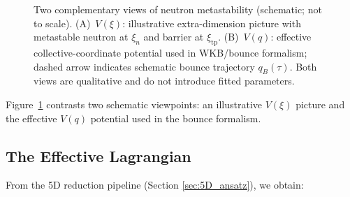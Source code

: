 \documentclass[11pt,a4paper]{article}
\begin{document}
\begin{figure}[ht]
\caption{Two complementary views of neutron metastability (schematic; not to scale).
(A)~$V(\xi)$: illustrative extra-dimension picture with metastable neutron at $\xi_n$ and barrier at $\xi_{\mathrm{tp}}$.
(B)~$V(q)$: effective collective-coordinate potential used in WKB/bounce formalism; dashed arrow indicates schematic bounce trajectory $q_B(\tau)$.
Both views are qualitative and do not introduce fitted parameters.}
\label{fig:metastability_views}
\end{figure}

Figure~\ref{fig:metastability_views} contrasts two schematic viewpoints: an illustrative $V(\xi)$ picture and the effective $V(q)$ potential used in the bounce formalism.

\subsection{The Effective Lagrangian}

From the 5D reduction pipeline (Section \ref{sec:5D_ansatz}), we obtain:
\end{document}

